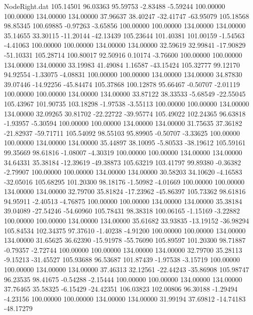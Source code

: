 \begin{filecontents}{NodeRight.dat}
 105.14501   96.03363   95.59753    -2.83488   -5.59244  100.00000  100.00000  134.00000  134.00000   37.96637   38.40247  -32.41747  -63.95079
 105.18568   98.85345  100.69885    -0.97263   -3.65856  100.00000  100.00000  134.00000  134.00000   35.14655   33.30115  -11.20144  -42.13439
 105.23644  101.40381  101.00159    -1.54563   -4.41063  100.00000  100.00000  134.00000  134.00000   32.59619   32.99841  -17.90829  -51.10331
 105.28714  100.80017   92.50916     0.10174   -3.76600  100.00000  100.00000  134.00000  134.00000   33.19983   41.49084    1.16587  -43.15424
 105.32777   99.12170   94.92554    -1.33075   -4.08831  100.00000  100.00000  134.00000  134.00000   34.87830   39.07446  -14.92256  -45.84474
 105.37868  100.12878   95.66467    -0.50707   -2.01119  100.00000  100.00000  134.00000  134.00000   33.87122   38.33533   -5.68549  -22.55045
 105.43967  101.90735  103.18298    -1.97538   -3.55113  100.00000  100.00000  134.00000  134.00000   32.09265   30.81702  -22.22722  -39.95774
 105.49022  102.24365   96.63818    -1.93957   -5.30594  100.00000  100.00000  134.00000  134.00000   31.75635   37.36182  -21.82937  -59.71711
 105.54092   98.55103   95.89905    -0.50707   -3.33625  100.00000  100.00000  134.00000  134.00000   35.44897   38.10095   -5.80533  -38.19612
 105.59161   99.35669   98.61816    -1.08007   -4.30319  100.00000  100.00000  134.00000  134.00000   34.64331   35.38184  -12.39619  -49.38873
 105.63219  103.41797   99.89380    -0.36382   -2.79907  100.00000  100.00000  134.00000  134.00000   30.58203   34.10620   -4.16583  -32.05016
 105.68295  101.20300   98.18176    -1.50982   -4.01669  100.00000  100.00000  134.00000  134.00000   32.79700   35.81824  -17.23962  -45.86397
 105.73362   98.61816   94.95911    -2.40513   -4.76875  100.00000  100.00000  134.00000  134.00000   35.38184   39.04089  -27.54246  -54.60960
 105.78431   98.38318  100.06165    -1.15169   -3.22882  100.00000  100.00000  134.00000  134.00000   35.61682   33.93835  -13.19152  -36.98294
 105.84534  102.34375   97.37610    -1.40238   -4.91200  100.00000  100.00000  134.00000  134.00000   31.65625   36.62390  -15.91978  -55.76090
 105.89597  101.20300   98.71887    -0.79357   -2.72744  100.00000  100.00000  134.00000  134.00000   32.79700   35.28113   -9.15213  -31.45527
 105.93688   96.53687  101.87439    -1.97538   -3.15719  100.00000  100.00000  134.00000  134.00000   37.46313   32.12561  -22.44243  -35.86908
 105.98747   96.23535   98.41675    -0.54288   -2.15444  100.00000  100.00000  134.00000  134.00000   37.76465   35.58325   -6.15429  -24.42351
 106.03823  102.00806   96.30188    -1.29494   -4.23156  100.00000  100.00000  134.00000  134.00000   31.99194   37.69812  -14.74183  -48.17279

\end{filecontents}
